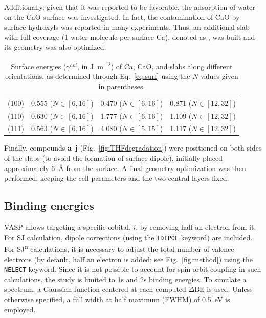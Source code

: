 \documentclass[%
aip,
amsmath,amssymb,
preprint,%
jcp,
showkeys,
]{revtex4-2}
\def\dbe{\ensuremath{\Delta\text{BE}}}
\begin{document}
Additionally, given that it was reported to be favorable\cite{deleeuwDensityFunctionalTheory2000,fujimoriInteractionWaterCaO2016a}, the adsorption of water on the CaO surface was investigated. In fact, the contamination of CaO by surface hydroxyls was reported in many experiments\cite{dupinSystematicXPSStudies2000,bebenseeAdsorptionOxygenWater2008,fujimoriInteractionWaterCaO2016a,cristXPSLibraryWebsite2021a}. Thus, an additional slab with full coverage (1 water molecule per surface Ca), denoted as , was built and its geometry was also optimized. 

\begin{table}
	\caption{Surface energies ($\gamma^{hkl}$, in \si{\joule\per\meter\squared}) of Ca, CaO, and  slabs along different orientations, as determined through Eq.~\eqref{eq:surf} using the $N$ values given in parentheses.}
	\label{tab:surf}
	\begin{ruledtabular}
	\begin{tabular}{lccc}
		
		&	\ce{Ca^0} & \ce{CaO} &	\ce{CaH2} \\
		\hline
		(100) & 0.555 ($N\in[6,16]$) & 0.470 ($N\in[6,16]$) & 0.871  ($N\in[12,32]$)\\
		(110) & 0.630  ($N\in[6,16]$)& 1.777  ($N\in[6,16]$)& 1.109 ($N\in[12,32]$)\\
		(111) & 0.563  ($N\in[6,16]$) & 4.080  ($N\in[5,15]$)  & 1.117   ($N\in[12,32]$) \\ 
		
	\end{tabular}
\end{ruledtabular}
\end{table}

Finally, compounds \textbf{a}--\textbf{j} (Fig.~\ref{fig:THFdegradation}) were positioned on both sides of the slabs (to avoid the formation of surface dipole), initially placed approximately \SI{6}{\angstrom} from the surface. A final geometry optimization was then performed, keeping the cell parameters and the two central layers fixed.

\subsection{Binding energies} 

VASP allows targeting a specific orbital, $i$, by removing half an electron from it. For SJ calculation, dipole corrections (using the \texttt{IDIPOL} keyword) are included. For SJ\textsuperscript{n} calculations, it is necessary to adjust the total number of valence electrons (by default, half an electron is added; see Fig.~\ref{fig:method}) using the \texttt{NELECT} keyword. Since it is not possible to account for spin-orbit coupling in such calculations, the study is limited to 1s and 2s binding energies. To simulate a spectrum, a Gaussian function centered at each computed \dbe{} is used. Unless otherwise specified, a full width at half maximum (FWHM) of \SI{0.5}{\electronvolt} is employed.
\end{document}
